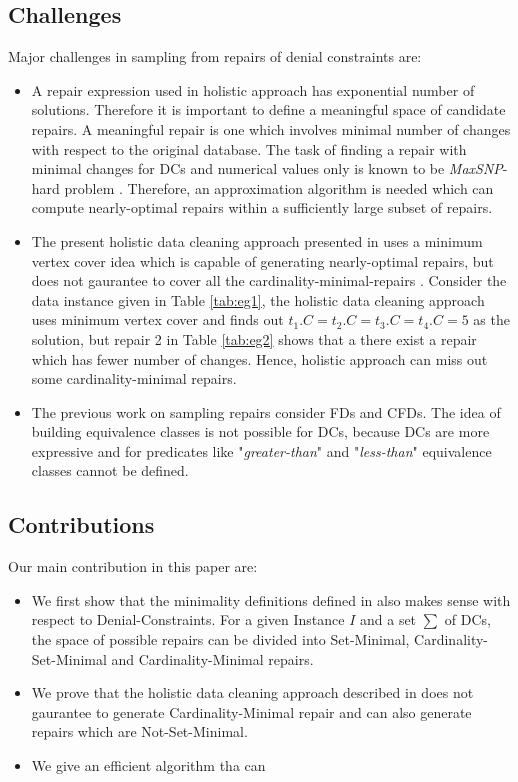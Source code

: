 \subsection{Challenges}
Major challenges in sampling from repairs of denial constraints are:

\begin{itemize}
\item A repair expression used in holistic approach \cite{XuChu} has exponential number of solutions.
Therefore it is important to define a meaningful space of candidate repairs.
A meaningful repair is one which involves minimal number of changes with respect to the original database.
The task of finding a repair with minimal changes for DCs and numerical values only is known to be \textit{MaxSNP}-hard problem \cite{Bertossi}.
Therefore, an approximation algorithm is needed which can compute nearly-optimal repairs within a sufficiently large subset of repairs.

\item The present holistic data cleaning approach presented in \cite{XuChu} uses a minimum vertex cover idea which is capable of generating nearly-optimal repairs, but does not gaurantee to cover all the cardinality-minimal-repairs \cite{Beskales_sampling}.
Consider the data instance given in Table \ref{tab:eg1}, the holistic data cleaning approach uses minimum vertex cover and finds out $t_1.C = t_2.C = t_3.C = t_4.C = 5$ as the solution, but repair 2 in Table \ref{tab:eg2} shows that a there exist a repair which has fewer number of changes.
Hence, holistic approach can miss out some cardinality-minimal repairs.

\item The previous work on sampling repairs \cite{Beskales_sampling} consider FDs and CFDs.
The idea of building equivalence classes is not possible for DCs, because DCs are more expressive and for predicates like "\textit{greater-than}" and "\textit{less-than}" equivalence classes cannot be defined.
\end{itemize}

\subsection{Contributions}

Our main contribution in this paper are:
\begin{itemize}
\item We first show that the minimality definitions defined in \cite{Beskales_journal} also makes sense with respect to Denial-Constraints.
For a given Instance $I$ and a set $\sum$ of DCs, the space of possible repairs can be divided into Set-Minimal, Cardinality-Set-Minimal and Cardinality-Minimal repairs.
\item We prove that the holistic data cleaning approach described in \cite{XuChu} does not gaurantee to generate Cardinality-Minimal repair and can also generate repairs which are Not-Set-Minimal.
\item We give an efficient algorithm tha can 
\end{itemize}
